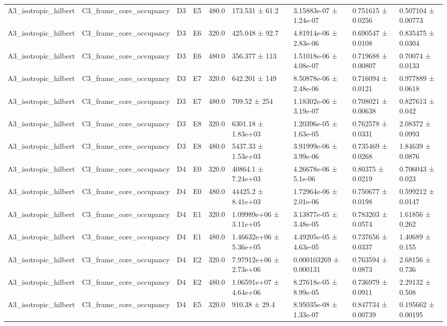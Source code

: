 \begin{table}
\begin{tabular}{lllllllll}
A3\_isotropic\_hilbert & C3\_frame\_core\_occupancy & D3 & E5 & 480.0 & 173.531 ± 61.2 & 3.15883e-07 ± 1.24e-07 & 0.751615 ± 0.0256 & 0.507104 ± 0.00773 \\
A3\_isotropic\_hilbert & C3\_frame\_core\_occupancy & D3 & E6 & 320.0 & 425.048 ± 92.7 & 4.81914e-06 ± 2.83e-06 & 0.690547 ± 0.0108 & 0.835475 ± 0.0304 \\
A3\_isotropic\_hilbert & C3\_frame\_core\_occupancy & D3 & E6 & 480.0 & 356.377 ± 113 & 1.51018e-06 ± 4.08e-07 & 0.719688 ± 0.00807 & 0.70074 ± 0.0133 \\
A3\_isotropic\_hilbert & C3\_frame\_core\_occupancy & D3 & E7 & 320.0 & 642.201 ± 149 & 8.50878e-06 ± 2.48e-06 & 0.716094 ± 0.0121 & 0.977889 ± 0.0618 \\
A3\_isotropic\_hilbert & C3\_frame\_core\_occupancy & D3 & E7 & 480.0 & 709.52 ± 254 & 1.18302e-06 ± 3.19e-07 & 0.708021 ± 0.00638 & 0.827613 ± 0.042 \\
A3\_isotropic\_hilbert & C3\_frame\_core\_occupancy & D3 & E8 & 320.0 & 6301.18 ± 1.83e+03 & 1.20396e-05 ± 1.63e-05 & 0.762578 ± 0.0331 & 2.08372 ± 0.0993 \\
A3\_isotropic\_hilbert & C3\_frame\_core\_occupancy & D3 & E8 & 480.0 & 5437.33 ± 1.53e+03 & 3.91999e-06 ± 3.99e-06 & 0.735469 ± 0.0268 & 1.84639 ± 0.0876 \\
A3\_isotropic\_hilbert & C3\_frame\_core\_occupancy & D4 & E0 & 320.0 & 40864.1 ± 7.24e+03 & 4.26678e-06 ± 5.1e-06 & 0.80375 ± 0.0219 & 0.706043 ± 0.023 \\
A3\_isotropic\_hilbert & C3\_frame\_core\_occupancy & D4 & E0 & 480.0 & 44425.2 ± 8.41e+03 & 1.72964e-06 ± 2.01e-06 & 0.750677 ± 0.0198 & 0.599212 ± 0.0147 \\
A3\_isotropic\_hilbert & C3\_frame\_core\_occupancy & D4 & E1 & 320.0 & 1.09989e+06 ± 3.11e+05 & 3.13877e-05 ± 3.48e-05 & 0.783203 ± 0.0574 & 1.61856 ± 0.262 \\
A3\_isotropic\_hilbert & C3\_frame\_core\_occupancy & D4 & E1 & 480.0 & 1.46632e+06 ± 5.36e+05 & 4.49205e-05 ± 4.63e-05 & 0.737656 ± 0.0337 & 1.40689 ± 0.155 \\
A3\_isotropic\_hilbert & C3\_frame\_core\_occupancy & D4 & E2 & 320.0 & 7.97912e+06 ± 2.73e+06 & 0.000103269 ± 0.000131 & 0.763594 ± 0.0873 & 2.68156 ± 0.736 \\
A3\_isotropic\_hilbert & C3\_frame\_core\_occupancy & D4 & E2 & 480.0 & 1.06591e+07 ± 4.64e+06 & 8.27618e-05 ± 8.99e-05 & 0.736979 ± 0.0911 & 2.29132 ± 0.508 \\
A3\_isotropic\_hilbert & C3\_frame\_core\_occupancy & D4 & E5 & 320.0 & 910.38 ± 29.4 & 8.95035e-08 ± 1.33e-07 & 0.847734 ± 0.00739 & 0.195662 ± 0.00195 \\

\end{tabular}
\end{table}
